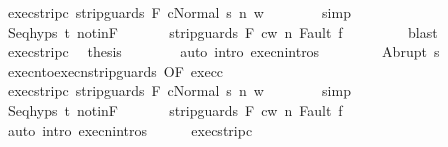 \begin{isabellebody}
\ exec{\isacharunderscore}strip{\isacharunderscore}c{}{\isacharcolon}\ {\isachardoublequoteopen}{\isasymGamma}{\isasymturnstile}{\isasymlangle}strip{\isacharunderscore}guards\ F\ c{}{\isacharcomma}Normal\ s{\isasymrangle}\ {\isacharequal}n{\isasymRightarrow}\ w{\isachardoublequoteclose}\isanewline
\ \ \ \ \ \ \isamarkupfalse%
\ simp\isanewline
\ \ \ \ \isamarkupfalse%
\ Seq{\isachardot}hyps\ t\ notinF\ \isanewline
\ \ \ \ \isamarkupfalse%
\ {\isachardoublequoteopen}{\isasymGamma}{\isasymturnstile}{\isasymlangle}strip{\isacharunderscore}guards\ F\ c{}{\isacharcomma}w{\isasymrangle}\ {\isacharequal}n{\isasymRightarrow}\ Fault\ f{\isachardoublequoteclose}\ \isanewline
\ \ \ \ \ \ \isamarkupfalse%
\ blast\isanewline
\ \ \ \ \isamarkupfalse%
\ exec{\isacharunderscore}strip{\isacharunderscore}c{}\ \isamarkupfalse%
\ {\isacharquery}thesis\isanewline
\ \ \ \ \ \ \isamarkupfalse%
\ {\isacharparenleft}auto\ intro{\isacharcolon}\ execn{\isachardot}intros{\isacharparenright}\isanewline
\ \ \isamarkupfalse%
\isanewline
\ \ \ \ \isamarkupfalse%
\ {\isacharparenleft}Abrupt\ s{\isacharprime}{\isacharparenright}\isanewline
\ \ \ \ \isamarkupfalse%
\ execn{\isacharunderscore}to{\isacharunderscore}execn{\isacharunderscore}strip{\isacharunderscore}guards\ {\isacharbrackleft}OF\ exec{\isacharunderscore}c{}{\isacharbrackright}\ \isanewline
\ \ \ \ \isamarkupfalse%
\ exec{\isacharunderscore}strip{\isacharunderscore}c{}{\isacharcolon}\ {\isachardoublequoteopen}{\isasymGamma}{\isasymturnstile}{\isasymlangle}strip{\isacharunderscore}guards\ F\ c{}{\isacharcomma}Normal\ s{\isasymrangle}\ {\isacharequal}n{\isasymRightarrow}\ w{\isachardoublequoteclose}\isanewline
\ \ \ \ \ \ \isamarkupfalse%
\ simp\isanewline
\ \ \ \ \isamarkupfalse%
\ Seq{\isachardot}hyps\ t\ notinF\ \isanewline
\ \ \ \ \isamarkupfalse%
\ {\isachardoublequoteopen}{\isasymGamma}{\isasymturnstile}{\isasymlangle}strip{\isacharunderscore}guards\ F\ c{}{\isacharcomma}w{\isasymrangle}\ {\isacharequal}n{\isasymRightarrow}\ Fault\ f{\isachardoublequoteclose}\ \isanewline
\ \ \ \ \ \ \isamarkupfalse%
\ {\isacharparenleft}auto\ intro{\isacharcolon}\ execn{\isachardot}intros{\isacharparenright}\isanewline
\ \ \ \ \isamarkupfalse%
\ exec{\isacharunderscore}strip{\isacharunderscore}c{}\ \isamarkupfalse%

\end{isabellebody}
